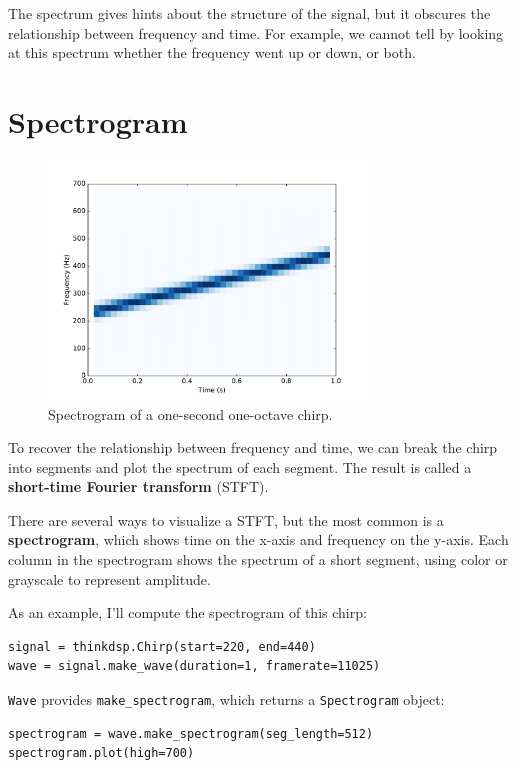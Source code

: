 \documentclass[12pt]{book}
\begin{document}
The spectrum gives hints about the structure of the signal,
but it obscures the relationship between frequency and time.
For example, we cannot tell by looking at this spectrum whether
the frequency went up or down, or both.


\section{Spectrogram}

\begin{figure}
\centerline{\includegraphics[height=2.5in]{figs/chirp2.pdf}}
\caption{Spectrogram of a one-second one-octave chirp.}
\label{fig.chirp2}
\end{figure}

To recover the relationship between frequency and time, we can break
the chirp into segments and plot the spectrum of each segment.  The
result is called a {\bf short-time Fourier transform} (STFT).

There are several ways to visualize a STFT, but the most common
is a {\bf spectrogram}, which shows time on the x-axis and frequency
on the y-axis.  Each column in the spectrogram shows the spectrum of
a short segment, using color or grayscale to represent amplitude.

As an example, I'll compute the spectrogram of this chirp:

\begin{verbatim}
signal = thinkdsp.Chirp(start=220, end=440)
wave = signal.make_wave(duration=1, framerate=11025)
\end{verbatim}

{\tt Wave} provides \verb"make_spectrogram", which returns a
{\tt Spectrogram} object:

\begin{verbatim}
spectrogram = wave.make_spectrogram(seg_length=512)
spectrogram.plot(high=700)
\end{verbatim}
\end{document}
